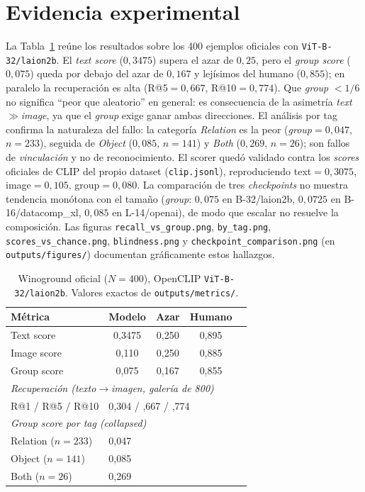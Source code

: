 \documentclass[10pt,a4paper]{article}
\begin{document}
\section{Evidencia experimental}
La Tabla~\ref{tab:res} reúne los resultados sobre los 400 ejemplos oficiales con
\texttt{ViT-B-32/laion2b}. El \emph{text score} ($0{,}3475$) supera el azar de $0{,}25$, pero el
\emph{group score} ($0{,}075$) queda por debajo del azar de $0{,}167$ y lejísimos del humano
($0{,}855$); en paralelo la recuperación es alta (R@5$=0{,}667$, R@10$=0{,}774$). Que
\emph{group} $<1/6$ no significa ``peor que aleatorio'' en general: es consecuencia de la asimetría
\emph{text}$\gg$\emph{image}, ya que el \emph{group} exige ganar ambas direcciones. El análisis por
tag confirma la naturaleza del fallo: la categoría \emph{Relation} es la peor
(\emph{group}$=0{,}047$, $n=233$), seguida de \emph{Object} ($0{,}085$, $n=141$) y \emph{Both}
($0{,}269$, $n=26$); son fallos de \emph{vinculación} y no de reconocimiento. El scorer quedó
validado contra los \emph{scores} oficiales de CLIP del propio dataset (\texttt{clip.jsonl}),
reproduciendo text$=0{,}3075$, image$=0{,}105$, group$=0{,}080$. La comparación de tres
\emph{checkpoints} no muestra tendencia monótona con el tamaño (\emph{group}: $0{,}075$ en
B-32/laion2b, $0{,}0725$ en B-16/datacomp\_xl, $0{,}085$ en L-14/openai), de modo que escalar no
resuelve la composición. Las figuras \texttt{recall\_vs\_group.png}, \texttt{by\_tag.png},
\texttt{scores\_vs\_chance.png}, \texttt{blindness.png} y \texttt{checkpoint\_comparison.png}
(en \texttt{outputs/figures/}) documentan gráficamente estos hallazgos.

\begin{table}[h]
\centering
\small
\caption{Winoground oficial ($N=400$), OpenCLIP \texttt{ViT-B-32/laion2b}. Valores exactos de
\texttt{outputs/metrics/}.}
\label{tab:res}
\begin{tabular}{lcccc}
\toprule
\textbf{Métrica} & \textbf{Modelo} & \textbf{Azar} & \textbf{Humano} & \\
\midrule
Text score            & 0,3475 & 0,250 & 0,895 & \\
Image score           & 0,110  & 0,250 & 0,885 & \\
Group score           & 0,075  & 0,167 & 0,855 & \\
\midrule
\multicolumn{5}{l}{\textit{Recuperación (texto$\rightarrow$imagen, galería de 800)}} \\
R@1 / R@5 / R@10       & \multicolumn{4}{l}{0,304 \; / \; 0,667 \; / \; 0,774} \\
\midrule
\multicolumn{5}{l}{\textit{Group score por tag (collapsed)}} \\
Relation ($n{=}233$)   & \multicolumn{4}{l}{0,047} \\
Object ($n{=}141$)     & \multicolumn{4}{l}{0,085} \\
Both ($n{=}26$)        & \multicolumn{4}{l}{0,269} \\
\bottomrule
\end{tabular}
\end{table}
\end{document}
